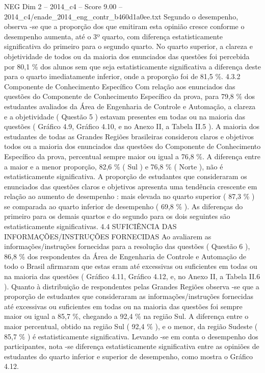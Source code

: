 \begin{textsample}{NEG Dim 2 – 2014\_c4 – Score 9.00 – 2014\_c4/enade\_2014\_eng\_contr\_b460d1a0ee.txt}
Segundo o desempenho, observa -se que a proporção dos que emitiram esta opinião cresce conforme o desempenho aumenta, até o 3º quarto, com diferença estatisticamente significativa do primeiro para o segundo quarto.
No quarto superior, a clareza e objetividade de todos ou da maioria dos enunciados das questões foi percebida por 80,1 \% dos alunos sem que seja estatisticamente significativa a diferença deste para o quarto imediatamente inferior, onde a proporção foi de 81,5 \%. 4.3.2 Componente de Conhecimento Específico Com relação aos enunciados das questões do Componente de Conhecimento Específico da prova, para 79,8 \% dos estudantes avaliados da Área de Engenharia de Controle e Automação, a clareza e a objetividade ( Questão 5 ) estavam presentes em todas ou na maioria das questões ( Gráfico 4.9, Gráfico 4.10, e no Anexo II, a Tabela II.5 ).
A maioria dos estudantes de todas as Grandes Regiões brasileiras considerou claros e objetivos todos ou a maioria dos enunciados das questões do Componente de Conhecimento Específico da prova, percentual sempre maior ou igual a 76,8 \%.
A diferença entre a maior e a menor proporção, 82,6 \% ( Sul ) e 76,8 \% ( Norte ), não é estatisticamente significativa.
A proporção de estudantes que consideraram os enunciados das questões claros e objetivos apresenta uma tendência crescente em relação ao aumento de desempenho : mais elevada no quarto superior ( 87,3 \% ) se comparada ao quarto inferior de desempenho ( 69,8 \% ).
As diferenças do primeiro para os demais quartos e do segundo para os dois seguintes são estatisticamente significativas. 4.4 SUFICIÊNCIA DAS INFORMAÇÕES/INSTRUÇÕES FORNECIDAS Ao avaliarem as informações/instruções fornecidas para a resolução das questões ( Questão 6 ), 86,8 \% dos respondentes da Área de Engenharia de Controle e Automação de todo o Brasil afirmaram que estas eram até excessivas ou suficientes em todas ou na maioria das questões ( Gráfico 4.11, Gráfico 4.12, e, no Anexo II, a Tabela II.6 ).
Quanto à distribuição de respondentes pelas Grandes Regiões observa -se que a proporção de estudantes que consideraram as informações/instruções fornecidas até excessivas ou suficientes em todas ou na maioria das questões foi sempre maior ou igual a 85,7 \%, chegando a 92,4 \% na região Sul.
A diferença entre o maior percentual, obtido na região Sul ( 92,4 \% ), e o menor, da região Sudeste ( 85,7 \% ) é estatisticamente significativa.
Levando -se em conta o desempenho dos participantes, nota -se diferença estatisticamente significativa entre as opiniões de estudantes do quarto inferior e superior de desempenho, como mostra o Gráfico 4.12.

\end{textsample}
